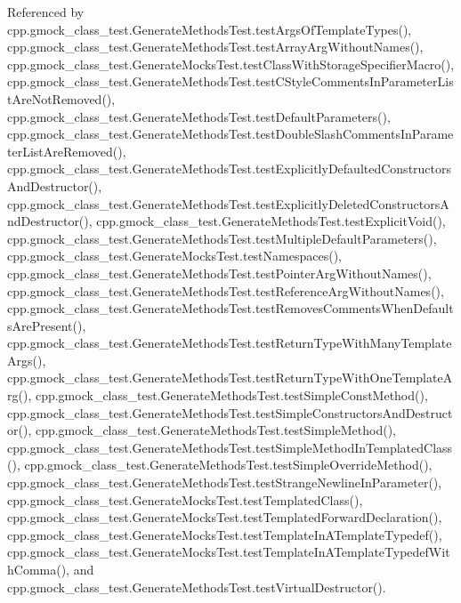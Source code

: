 Referenced by cpp.\+gmock\+\_\+class\+\_\+test.\+Generate\+Methods\+Test.\+test\+Args\+Of\+Template\+Types(), cpp.\+gmock\+\_\+class\+\_\+test.\+Generate\+Methods\+Test.\+test\+Array\+Arg\+Without\+Names(), cpp.\+gmock\+\_\+class\+\_\+test.\+Generate\+Mocks\+Test.\+test\+Class\+With\+Storage\+Specifier\+Macro(), cpp.\+gmock\+\_\+class\+\_\+test.\+Generate\+Methods\+Test.\+test\+C\+Style\+Comments\+In\+Parameter\+List\+Are\+Not\+Removed(), cpp.\+gmock\+\_\+class\+\_\+test.\+Generate\+Methods\+Test.\+test\+Default\+Parameters(), cpp.\+gmock\+\_\+class\+\_\+test.\+Generate\+Methods\+Test.\+test\+Double\+Slash\+Comments\+In\+Parameter\+List\+Are\+Removed(), cpp.\+gmock\+\_\+class\+\_\+test.\+Generate\+Methods\+Test.\+test\+Explicitly\+Defaulted\+Constructors\+And\+Destructor(), cpp.\+gmock\+\_\+class\+\_\+test.\+Generate\+Methods\+Test.\+test\+Explicitly\+Deleted\+Constructors\+And\+Destructor(), cpp.\+gmock\+\_\+class\+\_\+test.\+Generate\+Methods\+Test.\+test\+Explicit\+Void(), cpp.\+gmock\+\_\+class\+\_\+test.\+Generate\+Methods\+Test.\+test\+Multiple\+Default\+Parameters(), cpp.\+gmock\+\_\+class\+\_\+test.\+Generate\+Mocks\+Test.\+test\+Namespaces(), cpp.\+gmock\+\_\+class\+\_\+test.\+Generate\+Methods\+Test.\+test\+Pointer\+Arg\+Without\+Names(), cpp.\+gmock\+\_\+class\+\_\+test.\+Generate\+Methods\+Test.\+test\+Reference\+Arg\+Without\+Names(), cpp.\+gmock\+\_\+class\+\_\+test.\+Generate\+Methods\+Test.\+test\+Removes\+Comments\+When\+Defaults\+Are\+Present(), cpp.\+gmock\+\_\+class\+\_\+test.\+Generate\+Methods\+Test.\+test\+Return\+Type\+With\+Many\+Template\+Args(), cpp.\+gmock\+\_\+class\+\_\+test.\+Generate\+Methods\+Test.\+test\+Return\+Type\+With\+One\+Template\+Arg(), cpp.\+gmock\+\_\+class\+\_\+test.\+Generate\+Methods\+Test.\+test\+Simple\+Const\+Method(), cpp.\+gmock\+\_\+class\+\_\+test.\+Generate\+Methods\+Test.\+test\+Simple\+Constructors\+And\+Destructor(), cpp.\+gmock\+\_\+class\+\_\+test.\+Generate\+Methods\+Test.\+test\+Simple\+Method(), cpp.\+gmock\+\_\+class\+\_\+test.\+Generate\+Methods\+Test.\+test\+Simple\+Method\+In\+Templated\+Class(), cpp.\+gmock\+\_\+class\+\_\+test.\+Generate\+Methods\+Test.\+test\+Simple\+Override\+Method(), cpp.\+gmock\+\_\+class\+\_\+test.\+Generate\+Methods\+Test.\+test\+Strange\+Newline\+In\+Parameter(), cpp.\+gmock\+\_\+class\+\_\+test.\+Generate\+Mocks\+Test.\+test\+Templated\+Class(), cpp.\+gmock\+\_\+class\+\_\+test.\+Generate\+Mocks\+Test.\+test\+Templated\+Forward\+Declaration(), cpp.\+gmock\+\_\+class\+\_\+test.\+Generate\+Mocks\+Test.\+test\+Template\+In\+A\+Template\+Typedef(), cpp.\+gmock\+\_\+class\+\_\+test.\+Generate\+Mocks\+Test.\+test\+Template\+In\+A\+Template\+Typedef\+With\+Comma(), and cpp.\+gmock\+\_\+class\+\_\+test.\+Generate\+Methods\+Test.\+test\+Virtual\+Destructor().


